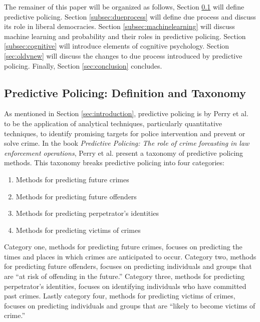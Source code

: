 \documentclass[12pt]{article} %
\newcommand{\hlfixme}[1]{\fxfatal{\hl{#1}}}
\begin{document}
The remainer of this paper will be organized as follows, Section \ref{subsec:predictivepolicing} will define predictive policing.
Section \ref{subsec:dueprocess} will define due process and discuss its role in liberal democracies. Section \ref{subsec:machinelearning} will discuss machine learning and probability and their roles in predictive policing. Section \ref{subsec:cognitive} will introduce elements of cognitive psychology. Section \ref{sec:oldvnew} will discuss the changes to due process introduced by predictive policing. Finally, Section \ref{sec:conclusion} concludes.

\subsection{Predictive Policing: Definition and Taxonomy} \label{subsec:predictivepolicing}%

As mentioned in Section \ref{sec:introduction}, predictive policing is by Perry et al. to be the application of analytical techniques, particularly quantitative techniques, to identify promising targets for police intervention and prevent or solve crime. In the book \textit{Predictive Policing: The role of crime forcasting in law enforcement operations}, Perry et al. present a taxonomy of predictive policing methods. This taxonomy breaks predictive policing into four categories: \cite{perryetal}

\begin{enumerate}
\item Methods for predicting future crimes
\item Methods for predicting future offenders
\item Methods for predicting perpetrator's identities
\item Methods for predicting victims of crimes
\end{enumerate}

Category one, methods for predicting future crimes, focuses on predicting the times and places in which crimes are anticipated to occur. Category two, methods for predicting future offenders, focuses on predicting individuals and groups that are ``at risk of offending in the future.'' Category three, methods for predicting perpetrator's identities, focuses on identifying individuals who have committed past crimes. Lastly category four, methods for predicting victims of crimes, focuses on predicting individuals and groups that are ``likely to become victims of crime.''
\end{document}
